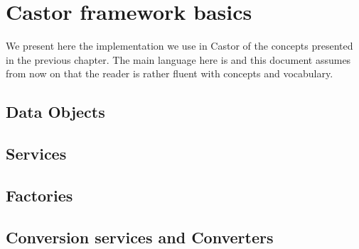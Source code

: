 %
%
%
%
%

\chapter{Castor framework basics}

We present here the implementation we use in Castor of the concepts
presented in the previous chapter. The main language here is \cpp
and this document assumes from now on that the reader is rather fluent
with \cpp concepts and vocabulary.

\section{Data Objects}



\section{Services}

\section{Factories}

\section{Conversion services and Converters}